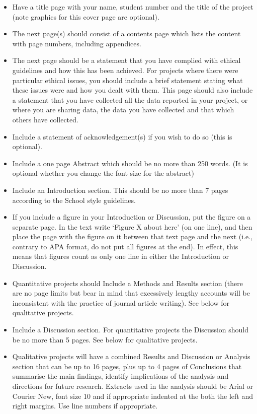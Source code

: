 \documentclass[
]{book}
\providecommand{\tightlist}{%
  \setlength{\itemsep}{0pt}\setlength{\parskip}{0pt}}
\begin{document}
\begin{itemize}
\tightlist
\item
  Have a title page with your name, student number and the title of the project (note graphics for this cover page are optional).
\item
  The next page(s) should consist of a contents page which lists the content with page numbers, including appendices.
\item
  The next page should be a statement that you have complied with ethical guidelines and how this has been achieved. For projects where there were particular ethical issues, you should include a brief statement stating what these issues were and how you dealt with them. This page should also include a statement that you have collected all the data reported in your project, or where you are sharing data, the data you have collected and that which others have collected.
\item
  Include a statement of acknowledgement(s) if you wish to do so (this is optional).
\item
  Include a one page Abstract which should be no more than 250 words. (It is optional whether you change the font size for the abstract)
\item
  Include an Introduction section. This should be no more than 7 pages according to the School style guidelines.
\item
  If you include a figure in your Introduction or Discussion, put the figure on a separate page. In the text write `Figure X about here' (on one line), and then place the page with the figure on it between that text page and the next (i.e., contrary to APA format, do not put all figures at the end). In effect, this means that figures count as only one line in either the Introduction or Discussion.
\item
  Quantitative projects should Include a Methods and Results section (there are no page limits but bear in mind that excessively lengthy accounts will be inconsistent with the practice of journal article writing). See below for qualitative projects.
\item
  Include a Discussion section. For quantitative projects the Discussion should be no more than 5 pages. See below for qualitative projects.
\item
  Qualitative projects will have a combined Results and Discussion or Analysis section that can be up to 16 pages, plus up to 4 pages of Conclusions that summarise the main findings, identify implications of the analysis and directions for future research. Extracts used in the analysis should be Arial or Courier New, font size 10 and if appropriate indented at the both the left and right margins. Use line numbers if appropriate.

\end{itemize}
\end{document}
